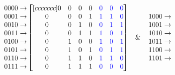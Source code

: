 \documentclass [a4paper, 11pt] {article}
\begin{document}
    \begin{figure}[H]
        \centering
        \begin{equation*}
            \begin{matrix}
               0000 \rightarrow \\
               0001 \rightarrow \\
               0010 \rightarrow \\
               0011 \rightarrow \\
               0100 \rightarrow \\
               0101 \rightarrow \\
               0110 \rightarrow \\
               0111 \rightarrow \\
            \end{matrix}
            \begin{bmatrix}[ccccccc]
               0 & 0 & 0 & 0 & \color{blue} 0 & \color{blue} 0 & \color{blue} 0 \\
               0 & 0 & 0 & 1 & \color{blue} 1 & \color{blue} 1 & \color{blue} 0 \\
               0 & 0 & 1 & 0 & \color{blue} 0 & \color{blue} 1 & \color{blue} 1 \\
               0 & 0 & 1 & 1 & \color{blue} 1 & \color{blue} 0 & \color{blue} 1 \\
               0 & 1 & 0 & 0 & \color{blue} 1 & \color{blue} 0 & \color{blue} 1 \\
               0 & 1 & 0 & 1 & \color{blue} 0 & \color{blue} 1 & \color{blue} 1 \\
               0 & 1 & 1 & 0 & \color{blue} 1 & \color{blue} 1 & \color{blue} 0 \\
               0 & 1 & 1 & 1 & \color{blue} 0 & \color{blue} 0 & \color{blue} 0 \\
            \end{bmatrix}
            \hspace{.3cm}\&\hspace{.4cm}
            \begin{matrix}
               1000 \rightarrow \\
               1001 \rightarrow \\
               1010 \rightarrow \\
               1011 \rightarrow \\
               1100 \rightarrow \\
               1101 \rightarrow \\

\end{matrix}
\end{equation*}
\end{figure}
\end{document}
